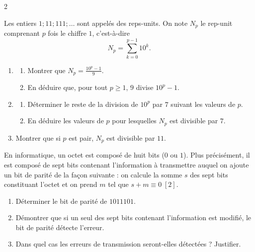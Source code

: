\documentclass[a4paper,12pt]{article}
\begin{document}
\begin{multicols}{2}
\begin{exercice}[title=Exercice 28 $\quad \star \star \quad$ { [Communiquer, Calculer] }]{}{}
    Les entiers $1 ; 11 ; 111 ; \dots$ sont appelés des reps-units. On note $N_p$ le rep-unit comprenant $p$ fois le chiffre $1$, c’est-à-dire 
    \[
    N_p = \sum_{k=0}^{p-1} 10^k.
    \]
    \begin{enumerate}
        \item 
        \begin{enumerate}
            \item Montrer que $N_p = \frac{10^p - 1}{9}$.
            \item En déduire que, pour tout $p \geq 1$, $9$ divise $10^p - 1$.
        \end{enumerate}
        \item 
        \begin{enumerate}
            \item Déterminer le reste de la division de $10^p$ par $7$ suivant les valeurs de $p$.
            \item En déduire les valeurs de $p$ pour lesquelles $N_p$ est divisible par $7$.
        \end{enumerate}
        \item Montrer que si $p$ est pair, $N_p$ est divisible par $11$.
    \end{enumerate}
    \end{exercice}
    
    \begin{exercice}[title=Exercice 29 $\quad \star \star \quad$ { [Modéliser, Chercher] }]{}{}
    En informatique, un octet est composé de huit bits ($0$ ou $1$). Plus précisément, il est composé de sept bits contenant l’information à transmettre auquel on ajoute un bit de parité de la façon suivante : on calcule la somme $s$ des sept bits constituant l’octet et on prend $m$ tel que $s + m \equiv 0 \; [2]$.
    \begin{enumerate}
        \item Déterminer le bit de parité de $1011101$.
        \item Démontrer que si un seul des sept bits contenant l’information est modifié, le bit de parité détecte l’erreur.
        \item Dans quel cas les erreurs de transmission seront-elles détectées ? Justifier.
    \end{enumerate}
    \end{exercice}
    

\end{multicols}
\end{document}
